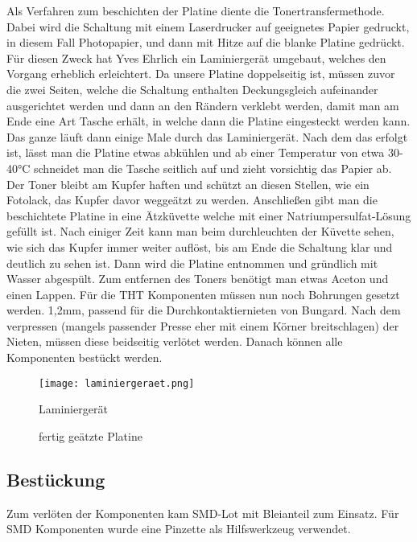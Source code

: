 \documentclass[12pt]{article}
\begin{document}
Als Verfahren zum beschichten der Platine diente die Tonertransfermethode. Dabei wird die Schaltung mit einem Laserdrucker auf geeignetes Papier gedruckt, in diesem Fall Photopapier, und dann mit Hitze auf die blanke Platine gedrückt. Für diesen Zweck hat Yves Ehrlich ein Laminiergerät umgebaut, welches den Vorgang erheblich erleichtert.
Da unsere Platine doppelseitig ist, müssen zuvor die zwei Seiten, welche die Schaltung enthalten Deckungsgleich aufeinander ausgerichtet werden und dann an den Rändern verklebt werden, damit man am Ende eine Art Tasche erhält, in welche dann die Platine eingesteckt werden kann.
Das ganze läuft dann einige Male durch das Laminiergerät. Nach dem das erfolgt ist, lässt man die Platine etwas abkühlen und ab einer Temperatur von etwa 30-40°C schneidet man die Tasche seitlich auf und zieht vorsichtig das Papier ab. Der Toner bleibt am Kupfer haften und schützt an diesen Stellen, wie ein Fotolack, das Kupfer davor weggeätzt zu werden.
Anschließen gibt man die beschichtete Platine in eine Ätzküvette welche mit einer Natriumpersulfat-Lösung gefüllt ist. Nach einiger Zeit kann man beim durchleuchten der Küvette sehen, wie sich das Kupfer immer weiter auflöst, bis am Ende die Schaltung klar und deutlich zu sehen ist. Dann wird die Platine entnommen und gründlich mit Wasser abgespült.
Zum entfernen des Toners benötigt man etwas Aceton und einen Lappen.
Für die THT Komponenten müssen nun noch Bohrungen gesetzt werden. 1,2mm, passend für die Durchkontaktiernieten von Bungard.
Nach dem verpressen (mangels passender Presse eher mit einem Körner breitschlagen) der Nieten, müssen diese beidseitig verlötet werden. Danach können alle Komponenten bestückt werden.

\begin{figure}[h]
	\texttt{[image: laminiergeraet.png]}
	\centering
	\caption{Laminiergerät}
\end{figure}

\begin{figure}[h]
	\centering 
\caption{fertig geätzte Platine} 
\end{figure} 

\newpage
\subsection{Bestückung}%

Zum verlöten der Komponenten kam SMD-Lot mit Bleianteil zum Einsatz.
Für SMD Komponenten wurde eine Pinzette als Hilfswerkzeug verwendet.
\end{document}
